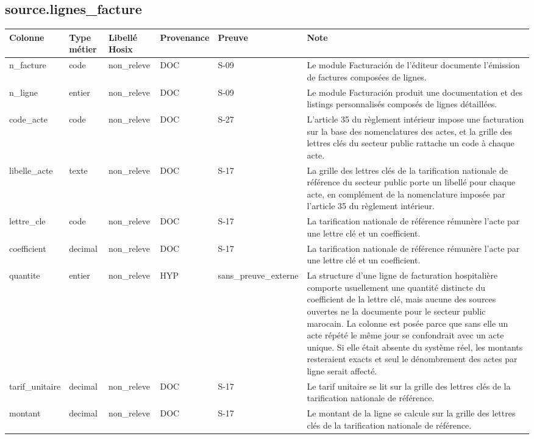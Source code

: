 \subsection*{source.lignes\_facture}
\begin{longtable}{p{2.5cm}p{1.8cm}p{2.8cm}p{1.3cm}p{2.2cm}p{5cm}}
\hline
Colonne & Type métier & Libellé Hosix & Provenance & Preuve & Note \\
\hline
\endhead
n\_facture & code & non\_releve & DOC & S-09 & Le module Facturación de l'éditeur documente l'émission de factures composées de lignes. \\
n\_ligne & entier & non\_releve & DOC & S-09 & Le module Facturación produit une documentation et des listings personnalisés composés de lignes détaillées. \\
code\_acte & code & non\_releve & DOC & S-27 & L'article 35 du règlement intérieur impose une facturation sur la base des nomenclatures des actes, et la grille des lettres clés du secteur public rattache un code à chaque acte. \\
libelle\_acte & texte & non\_releve & DOC & S-17 & La grille des lettres clés de la tarification nationale de référence du secteur public porte un libellé pour chaque acte, en complément de la nomenclature imposée par l'article 35 du règlement intérieur. \\
lettre\_cle & code & non\_releve & DOC & S-17 & La tarification nationale de référence rémunère l'acte par une lettre clé et un coefficient. \\
coefficient & decimal & non\_releve & DOC & S-17 & La tarification nationale de référence rémunère l'acte par une lettre clé et un coefficient. \\
quantite & entier & non\_releve & HYP & sans\_preuve\_externe & La structure d'une ligne de facturation hospitalière comporte usuellement une quantité distincte du coefficient de la lettre clé, mais aucune des sources ouvertes ne la documente pour le secteur public marocain. La colonne est posée parce que sans elle un acte répété le même jour se confondrait avec un acte unique. Si elle était absente du système réel, les montants resteraient exacts et seul le dénombrement des actes par ligne serait affecté. \\
tarif\_unitaire & decimal & non\_releve & DOC & S-17 & Le tarif unitaire se lit sur la grille des lettres clés de la tarification nationale de référence. \\
montant & decimal & non\_releve & DOC & S-17 & Le montant de la ligne se calcule sur la grille des lettres clés de la tarification nationale de référence. \\

\end{longtable}
